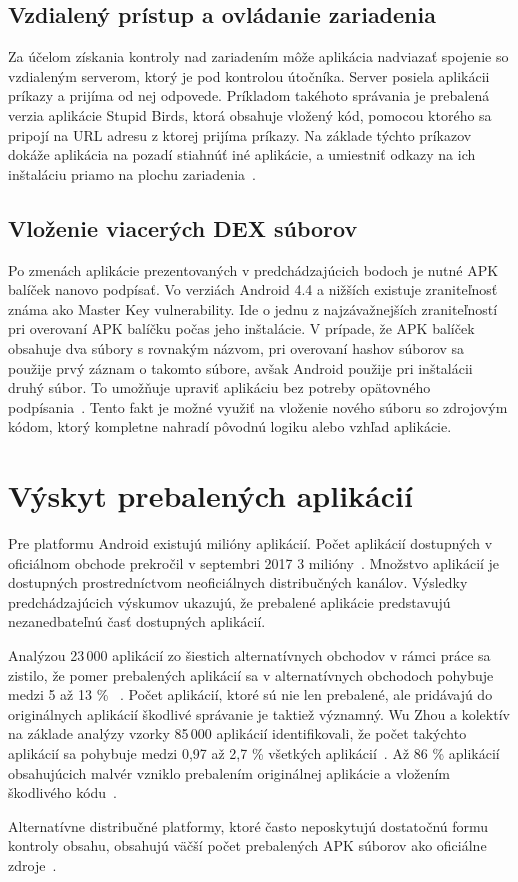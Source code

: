 \subsection*{Vzdialený prístup a ovládanie zariadenia}
Za účelom získania kontroly nad zariadením môže aplikácia nadviazať spojenie so vzdialeným serverom, ktorý je pod kontrolou útočníka. Server posiela aplikácii príkazy a prijíma od nej odpovede. Príkladom takéhoto správania je prebalená verzia aplikácie Stupid Birds, ktorá obsahuje vložený kód, pomocou ktorého sa pripojí na URL adresu z ktorej prijíma príkazy. Na základe týchto príkazov dokáže aplikácia na pozadí stiahnúť iné aplikácie, a umiestniť odkazy na ich inštaláciu priamo na plochu zariadenia~\cite{fakeapps}. 

\subsection*{Vloženie viacerých DEX súborov}
Po zmenách aplikácie prezentovaných v predchádzajúcich bodoch je nutné APK balíček nanovo podpísať. Vo verziách Android 4.4 a nižších existuje zraniteľnosť známa ako Master Key vulnerability. Ide o jednu z najzávažnejších zraniteľností pri overovaní APK balíčku počas jeho inštalácie. V prípade, že APK balíček obsahuje dva súbory s rovnakým názvom, pri overovaní hashov súborov sa použije prvý záznam o takomto súbore, avšak Android použije pri inštalácii druhý súbor. To umožňuje upraviť aplikáciu bez potreby opätovného podpísania~\cite{c2gYRVCI9leJhfOJ}. Tento fakt je možné využiť na vloženie nového súboru so zdrojovým kódom, ktorý kompletne nahradí pôvodnú logiku alebo vzhľad aplikácie.

\section{Výskyt prebalených aplikácií}
Pre platformu Android existujú milióny aplikácií. Počet aplikácií dostupných v oficiálnom obchode  prekročil v septembri 2017 3 milióny~\cite{Statista}. Množstvo aplikácií je dostupných prostredníctvom neoficiálnych distribučných kanálov.  Výsledky predchádzajúcich výskumov ukazujú, že prebalené aplikácie predstavujú nezanedbateľnú časť dostupných aplikácií.

Analýzou 23\,000 aplikácií zo šiestich alternatívnych obchodov v rámci práce  sa zistilo, že pomer prebalených aplikácií sa v alternatívnych obchodoch pohybuje medzi 5 až 13 \% ~\cite{DetectingRepackagedZhou}.
Počet aplikácií, ktoré sú nie len prebalené, ale pridávajú do originálnych aplikácií škodlivé správanie je taktiež významný. Wu Zhou a kolektív na základe analýzy vzorky 85\,000 aplikácií identifikovali, že počet takýchto aplikácií sa pohybuje medzi 0,97 až 2,7 \% všetkých aplikácií~\cite{Zhou2013}.
Až 86 \% aplikácií obsahujúcich malvér vzniklo prebalením originálnej aplikácie a vložením škodlivého kódu~\cite{androidThreats}.

Alternatívne distribučné platformy, ktoré často neposkytujú dostatočnú formu kontroly obsahu, obsahujú väčší počet prebalených APK súborov ako oficiálne zdroje~\cite{Zhauniarovich2013}. 
